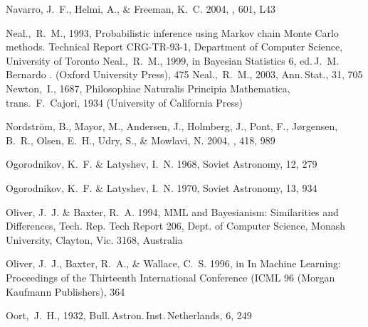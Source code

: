 \begin{thebibliography}{99}
{Navarro}, J.~F., {Helmi}, A., \& {Freeman}, K.~C. 2004, \apjl, 601, L43

  Neal.,~R.~M., 1993,
  Probabilistic inference using {M}arkov chain {M}onte {C}arlo methods.
  Technical Report CRG-TR-93-1, Department of Computer Science,
  University of Toronto
  Neal.,~R.~M., 1999,
  in Bayesian Statistics 6,
  ed.\,J.~M. Bernardo \etal. (Oxford University Press), 475
  Neal.,~R.~M., 2003,
  Ann.\,Stat., 31, 705
  Newton,~I., 1687,
  Philosophiae Naturalis Principia Mathematica,
  trans.\ F.~Cajori, 1934
  (University of California Press)

{Nordstr{\"o}m}, B., {Mayor}, M., {Andersen}, J., {Holmberg}, J., {Pont}, F.,
  {J{\o}rgensen}, B.~R., {Olsen}, E.~H., {Udry}, S., \& {Mowlavi}, N. 2004,
  \aap, 418, 989

{Ogorodnikov}, K.~F. \& {Latyshev}, I.~N. 1968, Soviet Astronomy, 12, 279

{Ogorodnikov}, K.~F. \& {Latyshev}, I.~N. 1970, Soviet Astronomy, 13, 934

{Oliver}, J.~J. \& {Baxter}, R.~A. 1994, {MML and Bayesianism: Similarities and
  Differences}, Tech. Rep. Tech Report 206, Dept. of Computer Science, Monash
  University, Clayton, Vic. 3168, Australia

{Oliver}, J.~J., {Baxter}, R.~A., \& {Wallace}, C.~S. 1996, in In Machine
  Learning: Proceedings of the Thirteenth International Conference (ICML 96
  (Morgan Kaufmann Publishers), 364

  Oort,~J.~H., 1932,
  Bull.\,Astron.\,Inst.\,Netherlands, 6, 249


\end{thebibliography}
